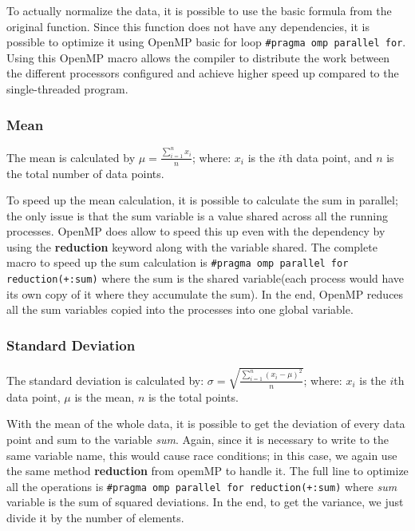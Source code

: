 \documentclass{article}
\begin{document}
To actually normalize the data, it is possible to use the basic formula from the original function. Since this function does not have any dependencies, it is possible to optimize it using OpenMP basic for loop \verb|#pragma omp parallel for|. Using this OpenMP macro allows the compiler to distribute the work between the different processors configured and achieve higher speed up compared to the single-threaded program.






\subsubsection{Mean} \label{sec: mean}
The mean is calculated by  $\mu = \frac{\sum_{i=1}^{n} x_i}{n}$;
where: $x_i$ is the $i$th data point, and $n$ is the total number of data points.


To speed up the mean calculation, it is possible to calculate the sum in parallel; the only issue is that the sum variable is a value shared across all the running processes.
OpenMP does allow to speed this up even with the dependency by using the \textbf{reduction} keyword along with the variable shared.
The complete macro to speed up the sum calculation is  \verb|#pragma omp parallel for reduction(+:sum)| where the sum is the shared variable(each process would have its own copy of it where they accumulate the sum). In the end, OpenMP reduces all the sum variables copied into the processes into one global variable.


\subsubsection{Standard Deviation} \label{sec: std_dev}
The standard deviation is calculated by: $\sigma = \sqrt{\frac{\sum_{i=1}^{n} (x_i - \mu)^2}{n}}$; where: $x_i$ is the $i$th data point, $\mu$ is the mean, $n$ is the total points.

With the mean of the whole data, it is possible to get the deviation of every data point and sum to the variable \textit{sum}.
Again, since it is necessary to write to the same variable name, this would cause race conditions; in this case, we again use the same method \textbf{reduction} from opemMP to handle it. The full line to optimize all the operations is \verb|#pragma omp parallel for reduction(+:sum)| where \textit{sum} variable is the sum of squared deviations. In the end, to get the variance, we just divide it by the number of elements.
\end{document}
